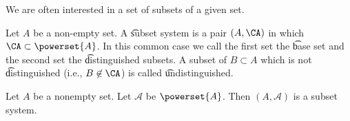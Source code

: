 

We are often interested in a set of subsets of a given set.


Let $A$ be a non-empty set.
A \t{subset system} is a pair $(A, \CA)$ in which $\CA \subset \powerset{A}$.
In this common case we call the first set the \t{base set} and the second set the \t{distinguished subsets}.
A subset of $B \subset A$ which is not \t{distinguished} (i.e., $B \not\in \CA$) is called \t{undistinguished}.



\begin{expl}
Let $A$ be a nonempty set.
Let $\mathcal{A}$ be $\powerset{A}$.
Then $(A, \mathcal{A})$ is a subset system.
\end{expl}

\blankpage
